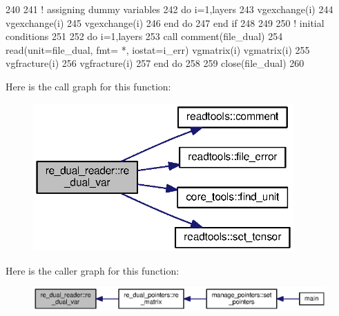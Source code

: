 \begin{DoxyCode}
240     
241     \textcolor{comment}{! assigning dummy variables}
242       \textcolor{keywordflow}{do} i=1,layers
243         vgexchange(i)%
244         vgexchange(i)%
245         vgexchange(i)%
246 \textcolor{keywordflow}{      end do}
247 \textcolor{keywordflow}{    end if}
248 
249             
250       \textcolor{comment}{! initial conditions}
251       
252       \textcolor{keywordflow}{do} i=1,layers
253         \textcolor{keyword}{call }comment(file\_dual)
254         \textcolor{keyword}{read}(unit=file\_dual, fmt= *, iostat=i\_err) vgmatrix(i)%
      vgmatrix(i)%
255         vgfracture(i)%
256         vgfracture(i)%
257 \textcolor{keywordflow}{      end do}
258       
259       \textcolor{keyword}{close}(file\_dual)
260 
\end{DoxyCode}


Here is the call graph for this function\+:\nopagebreak
\begin{figure}[H]
\begin{center}
\leavevmode
\includegraphics[width=283pt]{namespacere__dual__reader_a3ddb497789d4da4dea2afc55f283cf4b_cgraph}
\end{center}
\end{figure}




Here is the caller graph for this function\+:\nopagebreak
\begin{figure}[H]
\begin{center}
\leavevmode
\includegraphics[width=350pt]{namespacere__dual__reader_a3ddb497789d4da4dea2afc55f283cf4b_icgraph}
\end{center}
\end{figure}


